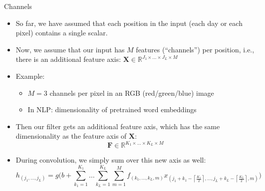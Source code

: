 
\begin{vbframe}{Channels}

\vfill

\begin{itemize}
	\item So far, we have assumed that each position in the input (each day or each pixel) contains a single scalar.
	\item Now, we assume that our input has $M$ features (``channels'') per position, i.e., there is an additional feature axis: $\mathbf{X} \in \mathbb{R}^{J_1 \times \ldots \times J_L \times M}$
	\item Example:
		\begin{itemize}
			\item $M=3$ channels per pixel in an RGB (red/green/blue) image
			\item In NLP: dimensionality of pretrained word embeddings
		\end{itemize}
	\item Then our filter gets an additional feature axis, which has the same dimensionality as the feature axis of $\mathbf{X}$:
	$$\mathbf{F} \in \mathbb{R}^{K_1 \times \ldots \times K_L \times M}$$
	\item During convolution, we simply sum over this new axis as well:
	$$h_{(j_1, \ldots, j_L)} = g\big(b + \sum_{k_1 = 1}^{K_1} \ldots \sum_{k_L = 1}^{K_L}  \sum_{m=1}^M f_{(k_1, \ldots, k_L, m)} x_{(j_1 + k_1 - \left\lceil \frac{K_1}{2} \right\rceil, \ldots, j_L + k_L - \left\lceil \frac{K_L}{2} \right\rceil, m)}\big)$$
\end{itemize}

\vfill

\end{vbframe}


